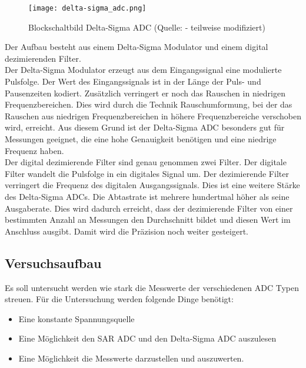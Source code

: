 \begin{figure}[h]
\centering
\texttt{[image: delta-sigma\_adc.png]}
\caption{Blockschaltbild Delta-Sigma ADC (Quelle: \cite{Baker2011_1} - teilweise modifiziert)}
\end{figure}

\noindent
Der Aufbau besteht aus einem Delta-Sigma Modulator und einem digital dezimierenden Filter.
\\
Der Delta-Sigma Modulator erzeugt aus dem Eingangssignal eine modulierte Pulsfolge. Der Wert des Eingangssignals ist in der Länge der Puls- und Pausenzeiten kodiert. Zusätzlich verringert er noch das Rauschen in niedrigen Frequenzbereichen. Dies wird durch die Technik Rauschumformung, bei der das Rauschen aus niedrigen Frequenzbereichen in höhere Frequenzbereiche verschoben wird, erreicht. Aus diesem Grund ist der Delta-Sigma ADC besonders gut für Messungen geeignet, die eine hohe Genauigkeit benötigen und eine niedrige Frequenz haben.
\cite{Baker2011_2}
\\
Der digital dezimierende Filter sind genau genommen zwei Filter. Der digitale Filter wandelt die Pulsfolge in ein digitales Signal um. Der dezimierende Filter verringert die Frequenz des digitalen Ausgangssignals. Dies ist eine weitere Stärke des Delta-Sigma ADCs. Die Abtastrate ist mehrere hundertmal höher als seine Ausgaberate. Dies wird dadurch erreicht, dass der dezimierende Filter von einer bestimmten Anzahl an Messungen den Durchschnitt bildet und diesen Wert im Anschluss ausgibt. Damit wird die Präzision noch weiter gesteigert.
\cite{Baker2011_2}

\subsection{Versuchsaufbau}
Es soll untersucht werden wie stark die Messwerte der verschiedenen ADC Typen streuen. Für die Untersuchung werden folgende Dinge benötigt:

\begin{itemize}
\itemsep0em
	\item Eine konstante Spannungsquelle
	\item Eine Möglichkeit den SAR ADC und den Delta-Sigma ADC auszulesen
	\item Eine Möglichkeit die Messwerte darzustellen und auszuwerten.
\end{itemize}

